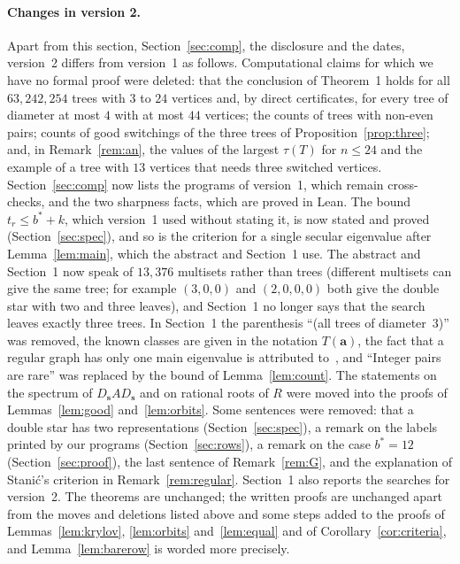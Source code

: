 \documentclass[11pt]{article}
\numberwithin{equation}{section}
\theoremstyle{remark}
\newcommand{\s}{\mathbf s}
\newcommand{\bfa}{\mathbf a}
\begin{document}
\paragraph{Changes in version 2.}
Apart from this section, Section~\ref{sec:comp}, the disclosure and the dates,
version~2 differs from version~1 as follows. Computational claims for which we
have no formal proof were deleted: that the conclusion of Theorem~1 holds for
all $63{,}242{,}254$ trees with $3$ to $24$ vertices and, by direct
certificates, for every tree of diameter at most $4$ with at most $44$
vertices; the counts of trees with non-even pairs; counts of good switchings of
the three trees of Proposition~\ref{prop:three}; and, in
Remark~\ref{rem:an}, the values of the largest $\tau(T)$ for $n\le24$ and the
example of a tree with $13$ vertices that needs three switched vertices.
Section~\ref{sec:comp} now lists the programs of version~1, which remain
cross-checks, and the two sharpness facts, which are proved in Lean. The bound $t_r\le b^*+k$, which version~1 used without stating
it, is now stated and proved (Section~\ref{sec:spec}), and so is the criterion
for a single secular eigenvalue after Lemma~\ref{lem:main}, which the abstract
and Section~1 use. The abstract and Section~1 now speak of $13{,}376$
multisets rather than trees (different multisets can give the same tree; for
example $(3,0,0)$ and $(2,0,0,0)$ both give the double star with two and three
leaves), and
Section~1 no longer says that the search leaves exactly three trees. In
Section~1 the parenthesis ``(all trees of diameter~$3$)'' was removed, the
known classes are given in the notation $T(\bfa)$, the fact that a regular
graph has only one main eigenvalue is attributed to~\cite{row07}, and ``Integer
pairs are rare'' was replaced by the bound of Lemma~\ref{lem:count}. The
statements on the spectrum of $D_{\s}AD_{\s}$ and on rational roots of $R$ were
moved into the proofs of Lemmas~\ref{lem:good} and~\ref{lem:orbits}. Some
sentences were removed: that a double star has two representations
(Section~\ref{sec:spec}), a remark on the labels printed by our programs
(Section~\ref{sec:rows}), a remark on the case $b^*=12$
(Section~\ref{sec:proof}), the last sentence of Remark~\ref{rem:G}, and the
explanation of Stani\'c's criterion in Remark~\ref{rem:regular}. Section~1 also
reports the searches for version~2. The theorems are unchanged; the written
proofs are unchanged apart from the moves and deletions listed above and some
steps added to the proofs of Lemmas~\ref{lem:krylov}, \ref{lem:orbits}
and~\ref{lem:equal} and of Corollary~\ref{cor:criteria}, and
Lemma~\ref{lem:barerow} is worded more precisely.
\end{document}
